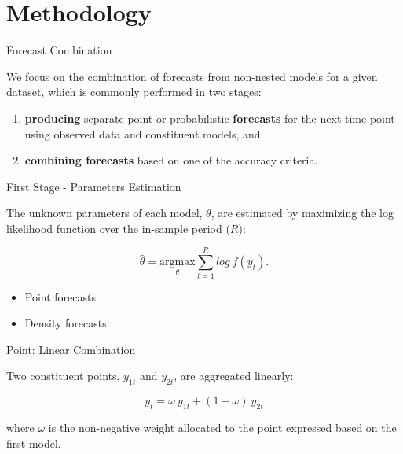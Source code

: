 
\section{Methodology}

\begin{frame}{Forecast Combination}

    We focus on the combination of forecasts from non-nested models for a given dataset, which is commonly performed in two stages:

    \vspace{5mm}

    \begin{enumerate}[<+->]
        \item \textbf{producing} separate point or probabilistic \textbf{forecasts} for the next time point using observed data and constituent models, and \newline
        \item \textbf{combining forecasts} based on one of the accuracy criteria. 
    \end{enumerate}

\end{frame}



\begin{frame}{First Stage - Parameters Estimation}

    The unknown parameters of each model, $\theta$, are estimated by maximizing the log likelihood function over the in-sample period ($R$):


    \begin{equation}
    \label{eqn:theta}
    \hat\theta = \underset{\theta}{\text{argmax}} \sum^R_{t=1} log \ f(y_t).
    \end{equation}

    \begin{itemize}
        \item Point forecasts
        \item Density forecasts
    \end{itemize}


\end{frame}



\begin{frame}{Point: Linear Combination}
    
    Two constituent points, $y_{1t}$ and $y_{2t}$, are aggregated linearly:
    
    \vspace{3mm}
    
    \begin{equation}
    \label{eqn:PC1}
    y_t = \omega \ y_{1t} + (1-\omega) \ y_{2t}
    \end{equation}
    
    \vspace{3mm}
    
    where $\omega$ is the non-negative weight allocated to the point expressed based on the first model.

\end{frame}



